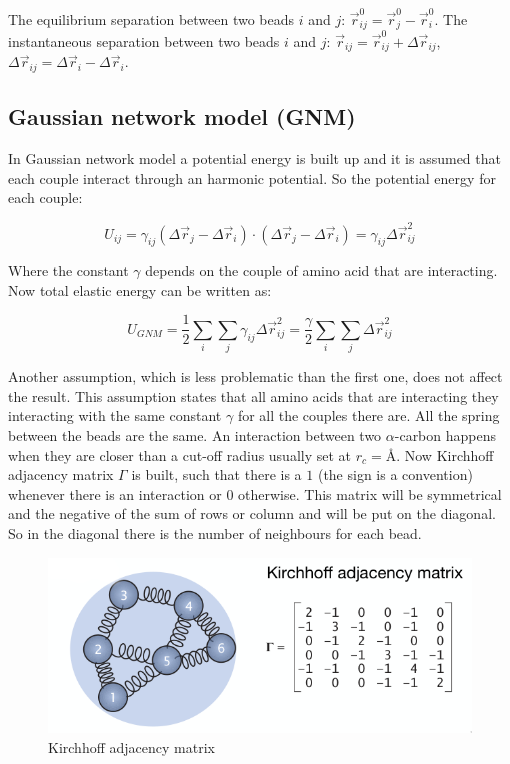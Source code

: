The equilibrium separation between two beads $i$ and $j$: $\vec{r}_{ij}^0 = \vec{r}_j^0-\vec{r}_i^0$.
The instantaneous separation between two beads $i$ and $j$: $\vec{r}_{ij} = \vec{r}_{ij}^0+\Delta\vec{r}_{ij}$, $\Delta\vec{r}_{ij} = \Delta\vec{r}_i-\Delta\vec{r}_i$.

	\subsection{Gaussian network model (GNM)}
	In Gaussian network model a potential energy is built up and it is assumed that each couple interact through an harmonic potential.
	So the potential energy for each couple:

	$$U_{ij} = \gamma_{ij}(\Delta\vec{r}_j-\Delta\vec{r}_i)\cdot(\Delta\vec{r}_j-\Delta\vec{r}_i) = \gamma_{ij}\Delta\vec{r}_{ij}^2$$

	Where the constant $\gamma$ depends on the couple of amino acid that are interacting.
	Now total elastic energy can be written as:

	$$U_{GNM} = \frac{1}{2}\sum\limits_i\sum\limits_j\gamma_{ij}\Delta\vec{r}^2_{ij} = \frac{\gamma}{2}\sum\limits_i\sum\limits_j\Delta\vec{r}_{ij}^2$$

	Another assumption, which is less problematic than the first one, does not affect the result.
	This assumption states that all amino acids that are interacting they interacting with the same constant $\gamma$ for all the couples there are.
	All the spring between the beads are the same.
	An interaction between two $\alpha$-carbon happens when they are closer than a cut-off radius usually set at $r_c = \si{\angstrom}$.
	Now Kirchhoff adjacency matrix $\Gamma$ is built, such that there is a $1$ (the sign is a convention) whenever there is an interaction or $0$ otherwise.
	This matrix will be symmetrical and the negative of the sum of rows or column and will be put on the diagonal.
	So in the diagonal there is the number of neighbours for each bead.

	\begin{figure}[H]
		\includegraphics[width=\textwidth]{kirchoff-adjacency-matrix}
		\caption{Kirchhoff adjacency matrix}
		\label{fig:kirchhoff-adjacency}
	\end{figure}

